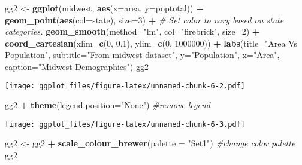 \documentclass[]{article}
\newenvironment{Shaded}{\begin{snugshade}}{\end{snugshade}}
\newcommand{\KeywordTok}[1]{\textcolor[rgb]{0.13,0.29,0.53}{\textbf{#1}}}
\newcommand{\DataTypeTok}[1]{\textcolor[rgb]{0.13,0.29,0.53}{#1}}
\newcommand{\DecValTok}[1]{\textcolor[rgb]{0.00,0.00,0.81}{#1}}
\newcommand{\FloatTok}[1]{\textcolor[rgb]{0.00,0.00,0.81}{#1}}
\newcommand{\StringTok}[1]{\textcolor[rgb]{0.31,0.60,0.02}{#1}}
\newcommand{\CommentTok}[1]{\textcolor[rgb]{0.56,0.35,0.01}{\textit{#1}}}
\newcommand{\OperatorTok}[1]{\textcolor[rgb]{0.81,0.36,0.00}{\textbf{#1}}}
\newcommand{\NormalTok}[1]{#1}
\begin{document}
\begin{Shaded}
\begin{Highlighting}[]
\NormalTok{gg2 <-}\StringTok{ }\KeywordTok{ggplot}\NormalTok{(midwest, }\KeywordTok{aes}\NormalTok{(}\DataTypeTok{x=}\NormalTok{area, }\DataTypeTok{y=}\NormalTok{poptotal)) }\OperatorTok{+}\StringTok{ }
\StringTok{  }\KeywordTok{geom_point}\NormalTok{(}\KeywordTok{aes}\NormalTok{(}\DataTypeTok{col=}\NormalTok{state), }\DataTypeTok{size=}\DecValTok{3}\NormalTok{) }\OperatorTok{+}\StringTok{  }\CommentTok{# Set color to vary based on state categories.}
\StringTok{  }\KeywordTok{geom_smooth}\NormalTok{(}\DataTypeTok{method=}\StringTok{"lm"}\NormalTok{, }\DataTypeTok{col=}\StringTok{"firebrick"}\NormalTok{, }\DataTypeTok{size=}\DecValTok{2}\NormalTok{) }\OperatorTok{+}\StringTok{ }
\StringTok{  }\KeywordTok{coord_cartesian}\NormalTok{(}\DataTypeTok{xlim=}\KeywordTok{c}\NormalTok{(}\DecValTok{0}\NormalTok{, }\FloatTok{0.1}\NormalTok{), }\DataTypeTok{ylim=}\KeywordTok{c}\NormalTok{(}\DecValTok{0}\NormalTok{, }\DecValTok{1000000}\NormalTok{)) }\OperatorTok{+}\StringTok{ }
\StringTok{  }\KeywordTok{labs}\NormalTok{(}\DataTypeTok{title=}\StringTok{"Area Vs Population"}\NormalTok{, }\DataTypeTok{subtitle=}\StringTok{"From midwest dataset"}\NormalTok{, }\DataTypeTok{y=}\StringTok{"Population"}\NormalTok{, }\DataTypeTok{x=}\StringTok{"Area"}\NormalTok{, }\DataTypeTok{caption=}\StringTok{"Midwest Demographics"}\NormalTok{)}
\NormalTok{gg2}
\end{Highlighting}
\end{Shaded}

\texttt{[image: ggplot\_files/figure-latex/unnamed-chunk-6-2.pdf]}

\begin{Shaded}
\begin{Highlighting}[]
\NormalTok{gg2 }\OperatorTok{+}\StringTok{ }\KeywordTok{theme}\NormalTok{(}\DataTypeTok{legend.position=}\StringTok{"None"}\NormalTok{)       }\CommentTok{#remove legend}
\end{Highlighting}
\end{Shaded}

\texttt{[image: ggplot\_files/figure-latex/unnamed-chunk-6-3.pdf]}

\begin{Shaded}
\begin{Highlighting}[]
\NormalTok{gg2 <-}\StringTok{ }\NormalTok{gg2 }\OperatorTok{+}\StringTok{ }\KeywordTok{scale_colour_brewer}\NormalTok{(}\DataTypeTok{palette =} \StringTok{"Set1"}\NormalTok{)      }\CommentTok{#change color palette}
\NormalTok{gg2}
\end{Highlighting}
\end{Shaded}
\end{document}
